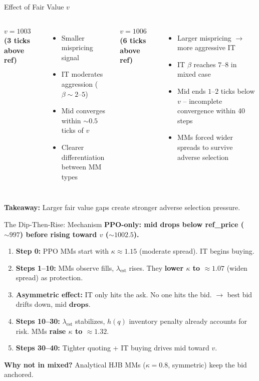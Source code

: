 \documentclass[10pt,aspectratio=169]{beamer}
\begin{document}
\begin{frame}{Effect of Fair Value $v$}
  \begin{columns}[T]
    \centering
    \textbf{$v = 1003$ (3 ticks above ref)}
    \begin{itemize}
      \item Smaller mispricing signal
      \item IT moderates aggression ($\beta \sim 2$--$5$)
      \item Mid converges within $\sim 0.5$ ticks of $v$
      \item Clearer differentiation between MM types
    \end{itemize}

    \centering
    \textbf{$v = 1006$ (6 ticks above ref)}
    \begin{itemize}
      \item Larger mispricing $\rightarrow$ more aggressive IT
      \item IT $\beta$ reaches $7$--$8$ in mixed case
      \item Mid ends $1$--$2$ ticks below $v$ -- incomplete convergence within 40 steps
      \item MMs forced wider spreads to survive adverse selection
    \end{itemize}
  \end{columns}

  \vspace{6pt}
  \textbf{Takeaway:} Larger fair value gaps create stronger adverse selection pressure.
\end{frame}

\begin{frame}{The Dip-Then-Rise: Mechanism}
  \textbf{PPO-only: mid drops below ref\_price ($\sim 997$) before rising toward $v$ ($\sim 1002.5$).}

  \begin{enumerate}
    \item \textbf{Step 0:} PPO MMs start with $\kappa \approx 1.15$ (moderate spread). IT begins buying.
    \item \textbf{Steps 1--10:} MMs observe fills, $\lambda_{\text{est}}$ rises.
          They \textbf{lower $\kappa$ to $\approx 1.07$} (widen spread) as protection.
    \item \textbf{Asymmetric effect:} IT only hits the ask. No one hits the bid.
          $\rightarrow$ best bid drifts down, mid $\textbf{drops}$.
    \item \textbf{Steps 10--30:} $\lambda_{\text{est}}$ stabilizes, $h(q)$ inventory penalty
          already accounts for risk. MMs \textbf{raise $\kappa$ to $\approx 1.32$}.
    \item \textbf{Steps 30--40:} Tighter quoting + IT buying drives mid toward $v$.
  \end{enumerate}

  \textbf{Why not in mixed?} Analytical HJB MMs ($\kappa = 0.8$, symmetric) keep the bid anchored.
\end{frame}
\end{document}

